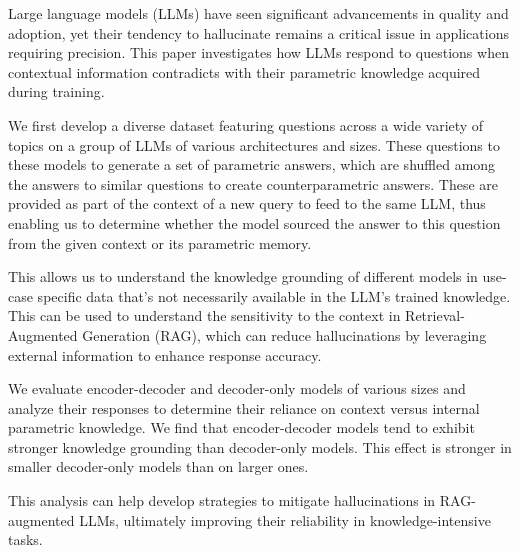 Large language models (LLMs) have seen significant advancements in quality and adoption, yet their tendency to hallucinate remains a critical issue in applications requiring precision.
This paper investigates how LLMs respond to questions when contextual information contradicts with their parametric knowledge acquired during training.

We first develop a diverse dataset featuring questions across a wide variety of topics on a group of LLMs of various architectures and sizes.
These questions to these models to generate a set of parametric answers, which are shuffled among the answers to similar questions to create counterparametric answers.
These are provided as part of the context of a new query to feed to the same LLM, thus enabling us to determine whether the model sourced the answer to this question from the given context or its parametric memory.

This allows us to understand the knowledge grounding of different models in use-case specific data that's not necessarily available in the LLM's trained knowledge.
This can be used to understand the sensitivity to the context in Retrieval-Augmented Generation (RAG), which can reduce hallucinations by leveraging external information to enhance response accuracy.

We evaluate encoder-decoder and decoder-only models of various sizes and analyze their responses to determine their reliance on context versus internal parametric knowledge.
We find that encoder-decoder models tend to exhibit stronger knowledge grounding than decoder-only models.
This effect is %
stronger in smaller decoder-only models than on larger ones.

This analysis can help develop strategies to mitigate hallucinations in RAG-augmented LLMs, ultimately improving their reliability in knowledge-intensive tasks.

